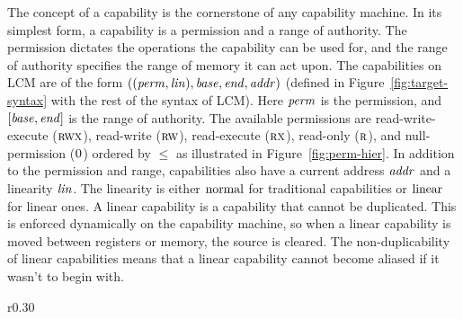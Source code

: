 \documentclass{jfp}
\newcommand{\trgcm}{\textsc{LCM}}
\begin{document}
The concept of a capability is the cornerstone of any capability machine.
In its simplest form, a capability is a permission and a range of authority.
The permission dictates the operations the capability can be used for, and the range of authority specifies the range of memory it can act upon.
The capabilities on \trgcm{} are of the form $((\mathit{perm},\mathit{lin}),\mathit{base},\mathit{end},\mathit{addr})$ (defined in Figure~\ref{fig:target-syntax} with the rest of the syntax of \trgcm{}). Here $\mathit{perm}$ is the permission, and $[\mathit{base},\mathit{end}]$ is the range of authority.
The available permissions are read-write-execute ($\textsc{rwx}$), read-write ($\textsc{rw}$), read-execute ($\textsc{rx}$), read-only ($\textsc{r}$), and null-permission ($\textsc{0}$) ordered by $\le$ as illustrated in Figure~\ref{fig:perm-hier}.
In addition to the permission and range, capabilities also have a current address $\mathit{addr}$ and a linearity $\mathit{lin}$.
The linearity is either $\mathrm{normal}$ for traditional capabilities or $\mathrm{linear}$ for linear ones.
A linear capability is a capability that cannot be duplicated.
This is enforced dynamically on the capability machine, so when a linear capability is moved between registers or memory, the source is cleared.
The non-duplicability of linear capabilities means that a linear capability cannot become aliased if it wasn't to begin with.

\begin{wrapfigure}{r}{0.30\linewidth}
  \centering

  \caption{Permission hierarchy}
  \label{fig:perm-hier}
\end{wrapfigure}%
%
\end{document}
